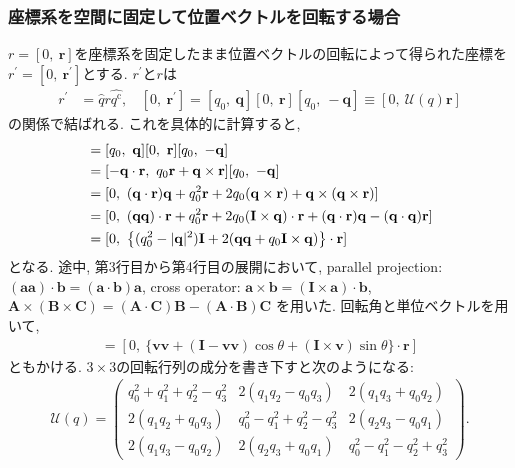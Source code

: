 \subsubsection{座標系を空間に固定して位置ベクトルを回転する場合}
$r=[0,~ \mathbf{r}]$を座標系を固定したまま位置ベクトルの回転によって得られた座標を
$r^{\prime}=[0,~ \mathbf{r}^{\prime}]$とする.
$r^{\prime}$と$r$は
\begin{align}
 r^{\prime} &= \hat{q} r \hat{q^{\mathrm{c}}}
 ,~~~~
 [0,~ \mathbf{r}^{\prime}]
 =
 [q_{0},~ \mathbf{q}] [0,~ \mathbf{r}] [q_{0},~ -\mathbf{q}]
 \equiv
 [0,~ \mathcal{U}(q)\mathbf{r}]
\end{align}
の関係で結ばれる. これを具体的に計算すると, 
\begin{align}
 [0,~ \mathbf{r}^{\prime}]
&=
 [q_{0},~ \mathbf{q}] [0,~ \mathbf{r}] [q_{0},~ -\mathbf{q}]
 \notag
 \\
&=
 [-\mathbf{q} \cdot \mathbf{r},~
  q_{0}\mathbf{r} + \mathbf{q} \times \mathbf{r}] 
 [q_{0},~ -\mathbf{q}]
 \notag
 \\
 &=
 [0,~
     (\mathbf{q} \cdot \mathbf{r}) \mathbf{q} 
    + q_{0}^{2} \mathbf{r}
    + 2q_{0} (\mathbf{q} \times \mathbf{r})
    + \mathbf{q} \times (\mathbf{q} \times \mathbf{r})
 ]
 \notag
 \\
 &=
 [0,~
     (\mathbf{qq}) \cdot \mathbf{r} 
    + q_{0}^{2} \mathbf{r}
    + 2q_{0} (\mathbf{I} \times \mathbf{q}) \cdot \mathbf{r}
    + (\mathbf{q} \cdot \mathbf{r}) \mathbf{q}
    - (\mathbf{q} \cdot \mathbf{q}) \mathbf{r}
 ]
 \notag
 \\
 &=
 [0,~ \left\{
          (q_{0}^{2}  - |\mathbf{q}|^{2}) \mathbf{I}
        + 2(\mathbf{qq} + q_{0}\mathbf{I} \times \mathbf{q})
     \right\}
     \cdot \mathbf{r}
 ]
 \notag
\end{align}
となる. 
途中, 第3行目から第4行目の展開において, 
parallel projection:
$(\mathbf{aa}) \cdot \mathbf{b} = (\mathbf{a} \cdot \mathbf{b})\mathbf{a}$,
cross operator:
$\mathbf{a} \times \mathbf{b}
= (\mathbf{I} \times \mathbf{a}) \cdot \mathbf{b}$,
$\mathbf{A} \times (\mathbf{B} \times \mathbf{C}) 
= (\mathbf{A} \cdot \mathbf{C}) \mathbf{B} 
- (\mathbf{A} \cdot \mathbf{B}) \mathbf{C}$
を用いた. 
回転角と単位ベクトルを用いて,
\begin{align}
  [0,~ \mathbf{r}^{\prime}] 
 =
  [0,~ 
  \{\mathbf{vv} + (\mathbf{I} - \mathbf{vv}) \cos \theta + (\mathbf{I} \times \mathbf{v}) \sin \theta \} \cdot \mathbf{r}]
\end{align}
ともかける.
$3 \times 3$の回転行列の成分を書き下すと次のようになる:
\begin{align}
 \mathcal{U}(q)
=
 \left(
   \begin{array}{ccc}
      q_{0}^{2} + q_{1}^{2} + q_{2}^{2} - q_{3}^{2} 
    & 2(q_{1} q_{2} - q_{0} q_{3})
    & 2(q_{1} q_{3} + q_{0} q_{2})
    \\
      2(q_{1} q_{2} + q_{0} q_{3})
    & q_{0}^{2} - q_{1}^{2} + q_{2}^{2} - q_{3}^{2} 
    & 2(q_{2} q_{3} - q_{0} q_{1})
    \\
      2(q_{1} q_{3} - q_{0} q_{2})
    & 2(q_{2} q_{3} + q_{0} q_{1})
    & q_{0}^{2} - q_{1}^{2} - q_{2}^{2} + q_{3}^{2} 
   \end{array}
\right).
\end{align}
